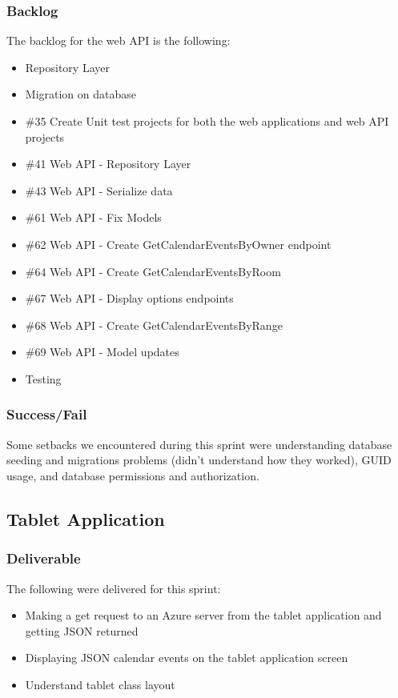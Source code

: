 \subsubsection{Backlog}
The backlog for the web API is the following:
\begin{itemize}
\item Repository Layer
\item Migration on database
\item \#35 Create Unit test projects for both the web applications and web API projects
\item \#41 Web API - Repository Layer
\item \#43 Web API - Serialize data
\item \#61 Web API - Fix Models
\item \#62 Web API - Create GetCalendarEventsByOwner endpoint
\item \#64 Web API - Create GetCalendarEventsByRoom
\item \#67 Web API - Display options endpoints
\item \#68 Web API - Create GetCalendarEventsByRange
\item \#69 Web API - Model updates
\item Testing
\end{itemize}

\subsubsection{Success/Fail}
Some setbacks we encountered during this sprint were understanding database seeding and migrations problems (didn't understand how they worked), GUID usage, and database permissions and authorization.

\subsection{Tablet Application}
\subsubsection{Deliverable}
The following were delivered for this sprint:
\begin{itemize}
\item Making a get request to an Azure server from the tablet application and getting JSON returned
\item Displaying JSON calendar events on the tablet application screen
\item Understand tablet class layout
\end{itemize}

